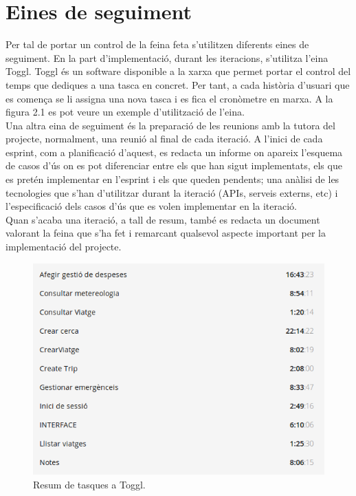 \section{Eines de seguiment}

Per tal de portar un control de la feina feta s'utilitzen diferents eines de seguiment. En la part d'implementació, durant les iteracions, s'utilitza l'eina Toggl. Toggl és un software disponible a la xarxa que permet portar el control del temps que dediques a una tasca en concret. Per tant, a cada història d'usuari que es comença se li assigna una nova tasca i es fica el cronòmetre en marxa. A la figura 2.1 es pot veure
un exemple d'utilització de l'eina.\\

Una altra eina de seguiment és la preparació de les reunions amb la tutora del projecte, normalment, una reunió al final de cada iteració. A l'inici de cada esprint, com a planificació d'aquest, es redacta un informe on apareix l'esquema de casos d'ús on es pot diferenciar entre els que han sigut implementats, els que es pretén implementar en l'esprint i els que queden pendents; una anàlisi de les tecnologies que s'han d'utilitzar durant la iteració (APIs, serveis externs, etc) i l'especificació dels
casos d'ús que es volen implementar en la iteració.\\

Quan s'acaba una iteració, a tall de resum, també es redacta un document
valorant la feina que s'ha fet i remarcant qualsevol aspecte important per la implementació del projecte.

\begin{figure}[!h]
\centering
\includegraphics[scale=0.65]{Figures/toggl.jpg}
\caption{Resum de tasques a Toggl.}
\end{figure}

